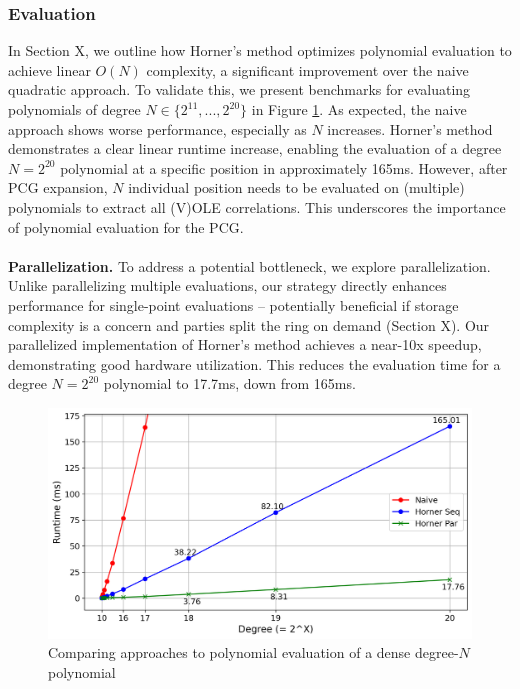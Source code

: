 \subsubsection{Evaluation}
In Section X, we outline how Horner's method optimizes polynomial evaluation to achieve linear $O(N)$ complexity, a significant improvement over the naive quadratic approach. To validate this, we present benchmarks for evaluating polynomials of degree $N \in \{2^{11}, ..., 2^{20}\}$ in Figure \ref{fig:polyEvalBench}. As expected, the naive approach shows worse performance, especially as $N$ increases. Horner's method demonstrates a clear linear runtime increase, enabling the evaluation of a degree $N=2^{20}$ polynomial at a specific position in approximately 165ms. However, after PCG expansion, $N$ individual position needs to be evaluated on (multiple) polynomials to extract all (V)OLE correlations. This underscores the importance of polynomial evaluation for the PCG.
\\\\
\textbf{Parallelization.} To address a potential bottleneck, we explore parallelization. Unlike parallelizing multiple evaluations, our strategy directly enhances performance for single-point evaluations – potentially beneficial if storage complexity is a concern and parties split the ring on demand (Section X). Our parallelized implementation of Horner's method achieves a near-10x speedup, demonstrating good hardware utilization. This reduces the evaluation time for a degree $N=2^{20}$ polynomial to 17.7ms, down from 165ms.

\begin{figure}[t]
    \centering
    \includegraphics[scale=0.49]{images/plots/poly_eval.png}
    \caption{Comparing approaches to polynomial evaluation of a dense degree-$N$ polynomial}
    \label{fig:polyEvalBench}
\end{figure}


